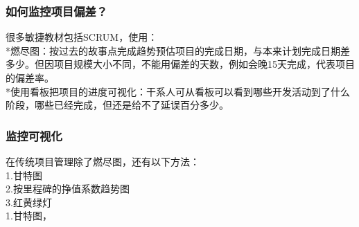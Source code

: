 \begin{description}
\item[]
\begin{description}
\tightlist
\item[]
= = = = =
\end{description}
\end{description}

\hypertarget{ux5982ux4f55ux76d1ux63a7ux9879ux76eeux504fux5dee}{%
\subsubsection{如何监控项目偏差？}\label{ux5982ux4f55ux76d1ux63a7ux9879ux76eeux504fux5dee}}

很多敏捷教材包括SCRUM，使用：\\
*燃尽图：按过去的故事点完成趋势预估项目的完成日期，与本来计划完成日期差多少。但因项目规模大小不同，不能用偏差的天数，例如会晚15天完成，代表项目的偏差率。\\
*使用看板把项目的进度可视化：干系人可从看板可以看到哪些开发活动到了什么阶段，哪些已经完成，但还是给不了延误百分多少。\\


\hypertarget{ux76d1ux63a7ux53efux89c6ux5316}{%
\subsubsection{监控可视化}\label{ux76d1ux63a7ux53efux89c6ux5316}}

在传统项目管理除了燃尽图，还有以下方法：\\
1.甘特图\\
2.按里程碑的挣值系数趋势图\\
3.红黄绿灯\\
1.甘特图，\\

